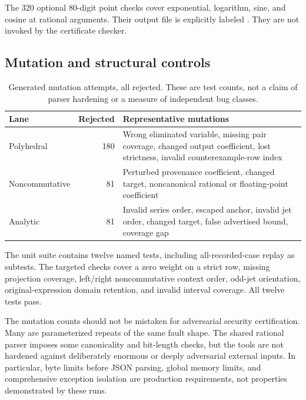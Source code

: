 The 320 optional 80-digit point checks cover exponential, logarithm, sine, and cosine at rational arguments. Their output file is explicitly labeled . They are not invoked by the certificate checker.

\subsection{Mutation and structural controls}
\begin{table}[ht]
\centering
\begin{tabular}{@{}lrp{}@{}}
\toprule
Lane & Rejected & Representative mutations \\
\midrule
Polyhedral & 180 & Wrong eliminated variable, missing pair coverage, changed output coefficient, lost strictness, invalid counterexample-row index \\
Noncommutative & 81 & Perturbed provenance coefficient, changed target, noncanonical rational or floating-point coefficient \\
Analytic & 81 & Invalid series order, escaped anchor, invalid jet order, changed target, false advertised bound, coverage gap \\
\bottomrule
\end{tabular}
\caption{Generated mutation attempts, all rejected. These are test counts, not a claim of parser hardening or a measure of independent bug classes.}
\end{table}

The unit suite contains twelve named tests, including all-recorded-case replay as subtests. The targeted checks cover a zero weight on a strict row, missing projection coverage, left/right noncommutative context order, odd-jet orientation, original-expression domain retention, and invalid interval coverage. All twelve tests pass.

The mutation counts should not be mistaken for adversarial security certification. Many are parameterized repeats of the same fault shape. The shared rational parser imposes some canonicality and bit-length checks, but the tools are not hardened against deliberately enormous or deeply adversarial external inputs. In particular, byte limits before JSON parsing, global memory limits, and comprehensive exception isolation are production requirements, not properties demonstrated by these runs.

